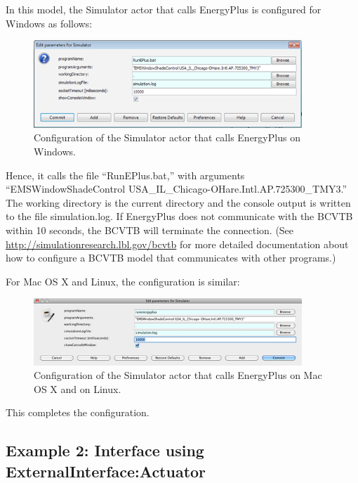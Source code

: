 In this model, the Simulator actor that calls EnergyPlus is configured for Windows as follows:

\begin{figure}[hbtp] %
\centering
\includegraphics[width=0.9\textwidth, height=0.9\textheight, keepaspectratio=true]{media/image006.png}
\caption{Configuration of the Simulator actor that calls EnergyPlus on Windows. \protect \label{fig:configuration-of-the-simulator-actor-that}}
\end{figure}

Hence, it calls the file ``RunEPlus.bat,'' with arguments ``EMSWindowShadeControl USA\_IL\_Chicago-OHare.Intl.AP.725300\_TMY3.'' The working directory is the current directory and the console output is written to the file simulation.log. If EnergyPlus does not communicate with the BCVTB within 10 seconds, the BCVTB will terminate the connection. (See \url{http://simulationresearch.lbl.gov/bcvtb} for more detailed documentation about how to configure a BCVTB model that communicates with other programs.)

For Mac OS X and Linux, the configuration is similar:

\begin{figure}[hbtp] %
\centering
\includegraphics[width=0.9\textwidth, height=0.9\textheight, keepaspectratio=true]{media/image007.png}
\caption{Configuration of the Simulator actor that calls EnergyPlus on Mac OS X and on Linux. \protect \label{fig:configuration-of-the-simulator-actor-that-001}}
\end{figure}

This completes the configuration.

\subsection{Example 2: Interface using ExternalInterface:Actuator}\label{example-2-interface-using-externalinterfaceactuator}

